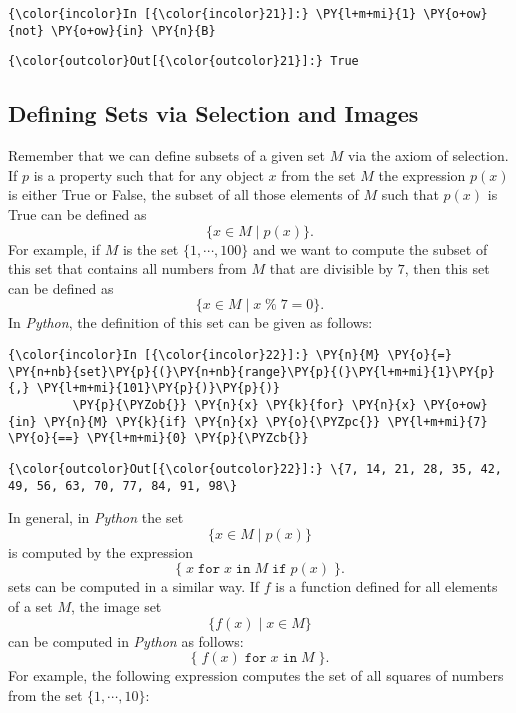 \begin{Verbatim}[commandchars=\\\{\}]
{\color{incolor}In [{\color{incolor}21}]:} \PY{l+m+mi}{1} \PY{o+ow}{not} \PY{o+ow}{in} \PY{n}{B}
\end{Verbatim}


\begin{Verbatim}[commandchars=\\\{\}]
{\color{outcolor}Out[{\color{outcolor}21}]:} True
\end{Verbatim}
            
\subsection{Defining Sets via Selection and
Images}\label{defining-sets-via-selection-and-images}
Remember that we can define subsets of a given set \(M\) via the axiom of
selection. If \(p\) is a property such that for any object \(x\) from
the set \(M\) the expression \(p(x)\) is either True or False, the
subset of all those elements of \(M\) such that \(p(x)\) is True can be
defined as
 \[ \{ x \in M \mid p(x) \}. \] 
For example, if \(M\) is the
set \(\{1, \cdots, 100\}\) and we want to compute the subset of this set
that contains all numbers from \(M\) that are divisible by \(7\), then
this set can be defined as 
\[ \{ x \in M \mid x \;\texttt{\%}\; 7 = 0 \}. \]
In \textsl{Python}, the definition of this set can be given as follows:

    \begin{Verbatim}[commandchars=\\\{\}]
{\color{incolor}In [{\color{incolor}22}]:} \PY{n}{M} \PY{o}{=} \PY{n+nb}{set}\PY{p}{(}\PY{n+nb}{range}\PY{p}{(}\PY{l+m+mi}{1}\PY{p}{,} \PY{l+m+mi}{101}\PY{p}{)}\PY{p}{)}
         \PY{p}{\PYZob{}} \PY{n}{x} \PY{k}{for} \PY{n}{x} \PY{o+ow}{in} \PY{n}{M} \PY{k}{if} \PY{n}{x} \PY{o}{\PYZpc{}} \PY{l+m+mi}{7} \PY{o}{==} \PY{l+m+mi}{0} \PY{p}{\PYZcb{}}
\end{Verbatim}


\begin{Verbatim}[commandchars=\\\{\}]
{\color{outcolor}Out[{\color{outcolor}22}]:} \{7, 14, 21, 28, 35, 42, 49, 56, 63, 70, 77, 84, 91, 98\}
\end{Verbatim}
In general, in \textsl{Python} the set
 \[ \{ x \in M \mid p(x) \} \] 
is computed by the expression 
\[ \{\; x\; \texttt{for}\; x\; \texttt{in}\; M\; \texttt{if}\; p(x)\; \}. \]
 sets can be computed in a similar way. If \(f\) is a
function defined for all elements of a set \(M\), the image set
\[ \{ f(x) \mid x \in M \} \] can be computed in \textsl{Python} as
follows: \[ \{\; f(x)\; \texttt{for}\; x\; \texttt{in}\; M\; \}. \] For
example, the following expression computes the set of all squares of
numbers from the set \(\{1,\cdots,10\}\):

